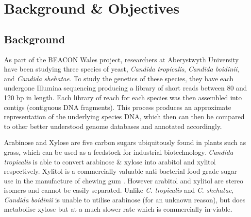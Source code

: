 \chapter{Background \& Objectives}

% 
% 
%    
%    

\section{Background}
As part of the BEACON Wales\cite{beacon} project, researchers at Aberystwyth University have been studying three species of yeast, \textit{Candida tropicalis}, \textit{Candida boidinii}, and \textit{Candida shehatae}. To study the genetics of these species, they have each undergone Illumina sequencing producing a library of short reads between 80 and 120 bp in length. Each library of reach for each species was then assembled into contigs (contiguous DNA fragments). This process produces an approximate representation of the underlying species DNA, which then can then be compared to other better understood genome databases and annotated accordingly.

Arabinose and Xylose are five carbon sugars ubiquitously found in plants such as grass, which can be used as a feedstock for industrial biotechnology. \textit{Candida tropicalis} is able to convert arabinose \& xylose into arabitol and xylitol respectively. Xylitol is a commercially valuable anti-bacterial food grade sugar use in the manufacture of chewing gum \cite{xylitol}. However arabitol and xylitol are stereo isomers and cannot be easily separated. Unlike \textit{C. tropicalis} and \textit{C. shehatae},  \textit{Candida boidinii} is unable to utilise arabinose (for an unknown reason), but does metabolise xylose but at a much slower rate which is commercially in-viable.

